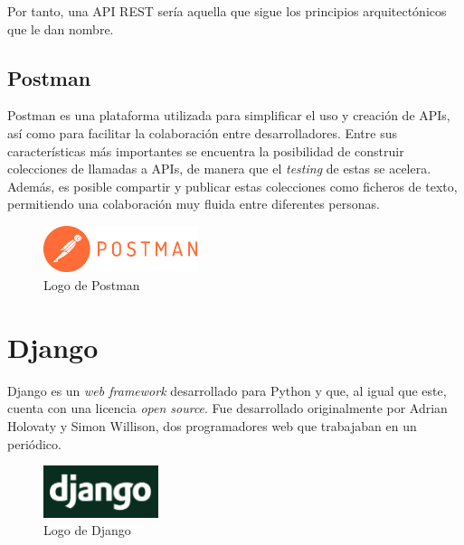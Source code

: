 Por tanto, una API REST sería aquella que sigue los principios arquitectónicos que le dan nombre.

\subsection{Postman}\label{sec:postman}

Postman es una plataforma utilizada para simplificar el uso y creación de APIs, así como para facilitar la colaboración entre desarrolladores. Entre sus características más importantes se encuentra la posibilidad de construir colecciones de llamadas a APIs, de manera que el \emph{testing} de estas se acelera. Además, es posible compartir y publicar estas colecciones como ficheros de texto, permitiendo una colaboración muy fluida entre diferentes personas. \emph{\parencite{Reference30}}

\begin{figure}[ht]
    \centering
    \includegraphics[width=0.4\textwidth]{Figures/postman-logo}
    \decoRule
    \caption[Postman (Logo)]{Logo de Postman \emph{\parencite{Reference29}}}
    \label{fig:postman-logo}
\end{figure}


\section{Django}\label{sec:django}

Django es un \emph{web framework} desarrollado para Python y que, al igual que este, cuenta con una licencia \emph{open source}. Fue desarrollado originalmente por Adrian Holovaty y Simon Willison, dos programadores web que trabajaban en un periódico. \emph{\parencite{Reference4}}

\begin{figure}[ht]
    \centering
    \includegraphics[width=0.3\textwidth]{Figures/django-logo}
    \decoRule
    \caption[Django (Logo)]{Logo de Django \emph{\parencite{Reference5}}}
    \label{fig:django-logo}
\end{figure}

